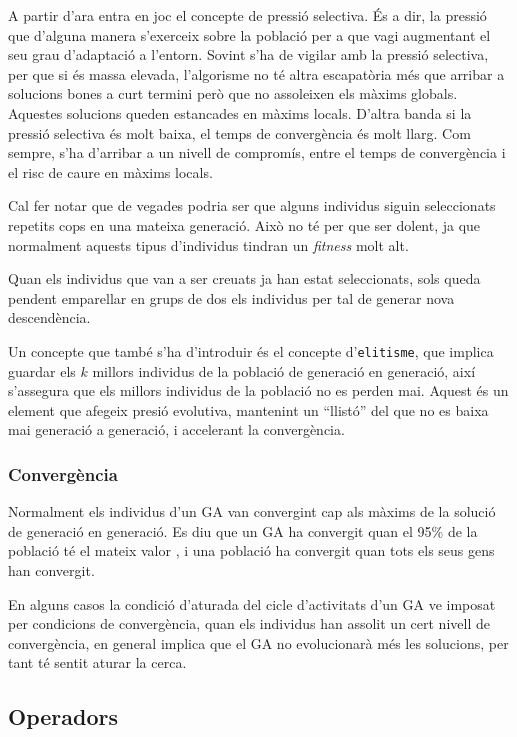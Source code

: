 A partir d'ara entra en joc el concepte de pressió selectiva. És a dir, la
pressió que d'alguna manera s'exerceix sobre la població per a que vagi
augmentant el seu grau d'adaptació a l'entorn. Sovint s'ha de vigilar amb la
pressió selectiva, per que si és massa elevada, l'algorisme no té altra
escapatòria més que arribar a solucions bones a curt termini però que no
assoleixen els màxims globals. Aquestes solucions queden estancades en màxims
locals. D'altra banda si la pressió selectiva és molt baixa, el temps de
convergència és molt llarg.  Com sempre, s'ha d'arribar a un nivell de
compromís, entre el temps de convergència i el risc de caure en màxims locals.

Cal fer notar que de vegades podria ser que alguns individus siguin seleccionats
repetits cops en una mateixa generació. Això no té per que ser dolent, ja que
normalment aquests tipus d'individus tindran un \emph{fitness} molt alt.

Quan els individus que van a ser creuats ja han estat seleccionats, sols queda
pendent emparellar en grups de dos els individus per tal de generar nova
descendència. 

Un concepte que també s'ha d'introduir és el concepte d'\texttt{elitisme}, que
implica guardar els $k$ millors individus de la població de generació en
generació, així s'assegura que els millors individus de la població no es perden
mai.  Aquest és un element que afegeix presió evolutiva, mantenint un ``llistó''
del que no es baixa mai generació a generació, i accelerant la convergència.

\subsubsection{Convergència} 

Normalment els individus d'un GA van convergint cap als màxims de la solució de
generació en generació. Es diu que un GA ha convergit quan el 95\% de la
població té el mateix valor \cite{D75}, i una població ha convergit quan tots
els seus gens han convergit.

En alguns casos la condició d'aturada del cicle d'activitats d'un GA ve imposat
per condicions de convergència, quan els individus han assolit un cert nivell de
convergència, en general implica que el GA no evolucionarà més les solucions,
per tant té sentit aturar la cerca.

\subsection{Operadors\label{subsec:operadors}} 

